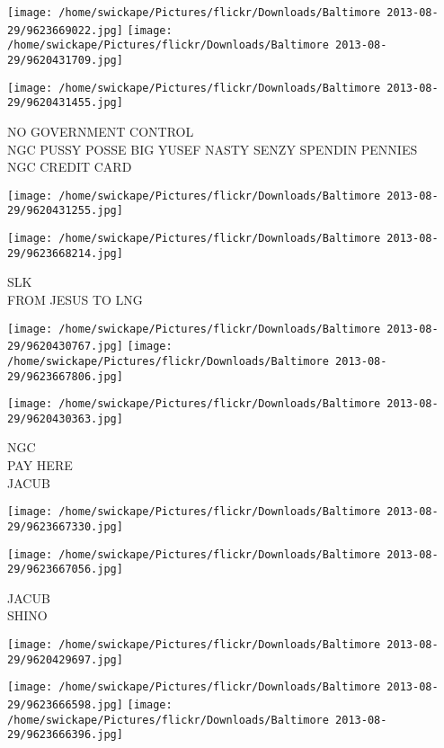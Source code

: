\documentclass[10pt,letterpaper]{article}
\begin{document}
\texttt{[image: /home/swickape/Pictures/flickr/Downloads/Baltimore 2013-08-29/9623669022.jpg]}
\texttt{[image: /home/swickape/Pictures/flickr/Downloads/Baltimore 2013-08-29/9620431709.jpg]}

\texttt{[image: /home/swickape/Pictures/flickr/Downloads/Baltimore 2013-08-29/9620431455.jpg]}

NO GOVERNMENT CONTROL\\
NGC PUSSY POSSE BIG YUSEF NASTY SENZY SPENDIN PENNIES\\
NGC CREDIT CARD
\pagebreak

\texttt{[image: /home/swickape/Pictures/flickr/Downloads/Baltimore 2013-08-29/9620431255.jpg]}

\vspace{0.25in}
\texttt{[image: /home/swickape/Pictures/flickr/Downloads/Baltimore 2013-08-29/9623668214.jpg]}

SLK\\
FROM JESUS TO LNG
\pagebreak

\texttt{[image: /home/swickape/Pictures/flickr/Downloads/Baltimore 2013-08-29/9620430767.jpg]}
\texttt{[image: /home/swickape/Pictures/flickr/Downloads/Baltimore 2013-08-29/9623667806.jpg]}

\vspace{0.25in}
\texttt{[image: /home/swickape/Pictures/flickr/Downloads/Baltimore 2013-08-29/9620430363.jpg]}

NGC\\
PAY HERE\\
JACUB
\pagebreak

\texttt{[image: /home/swickape/Pictures/flickr/Downloads/Baltimore 2013-08-29/9623667330.jpg]}

\vspace{0.25in}
\texttt{[image: /home/swickape/Pictures/flickr/Downloads/Baltimore 2013-08-29/9623667056.jpg]}

JACUB\\
SHINO
\pagebreak

\texttt{[image: /home/swickape/Pictures/flickr/Downloads/Baltimore 2013-08-29/9620429697.jpg]}

\vspace{0.25in}
\texttt{[image: /home/swickape/Pictures/flickr/Downloads/Baltimore 2013-08-29/9623666598.jpg]}
\texttt{[image: /home/swickape/Pictures/flickr/Downloads/Baltimore 2013-08-29/9623666396.jpg]}
\end{document}

